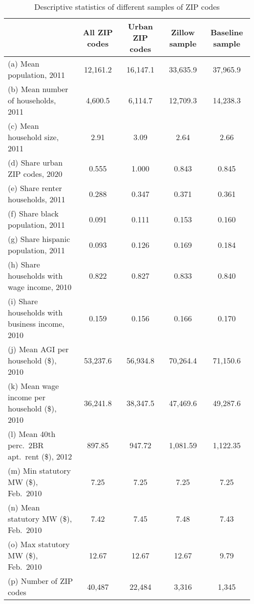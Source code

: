 \begin{table}[hbt!] \centering
    \caption{Descriptive statistics of different samples of ZIP codes}
    \label{tab:stats_zip_samples}
    \begin{tabular}{@{}lcccc@{}}
        \toprule
                                                         & \multicolumn{1}{c}{All ZIP codes}
                                                         & \multicolumn{1}{c}{Urban ZIP codes}
                                                         & \multicolumn{1}{c}{Zillow sample}
                                                         & \multicolumn{1}{c}{Baseline sample}          \\ \midrule
        (a) Mean population, 2011                        & 12,161.2 & 16,147.1 & 33,635.9 & 37,965.9     \\
        (b) Mean number of households, 2011              & 4,600.5  & 6,114.7  & 12,709.3 & 14,238.3     \\
        (c) Mean household size, 2011                    & 2.91     & 3.09    & 2.64    & 2.66           \\
        (d) Share urban ZIP codes, 2020                  & 0.555    & 1.000   & 0.843   & 0.845          \\
        (e) Share renter households, 2011                & 0.288    & 0.347   & 0.371   & 0.361          \\
        (f) Share black population, 2011                 & 0.091    & 0.111   & 0.153   & 0.160          \\
        (g) Share hispanic population, 2011              & 0.093    & 0.126   & 0.169   & 0.184          \\
        (h) Share households with wage income, 2010      & 0.822    & 0.827   & 0.833   & 0.840          \\
        (i) Share households with business income, 2010  & 0.159    & 0.156   & 0.166   & 0.170          \\
        (j) Mean AGI per household (\$), 2010           & 53,237.6 & 56,934.8 & 70,264.4 & 71,150.6      \\
        (k) Mean wage income per household (\$), 2010   & 36,241.8 & 38,347.5 & 47,469.6 & 49,287.6      \\
        (l) Mean 40th perc.\ 2BR apt.\ rent (\$), 2012   & 897.85  & 947.72  & 1,081.59  & 1,122.35      \\
        (m) Min statutory MW (\$), Feb.\ 2010            & 7.25    & 7.25    & 7.25     & 7.25           \\
        (n) Mean statutory MW (\$), Feb.\ 2010           & 7.42    & 7.45    & 7.48     & 7.43           \\
        (o) Max statutory MW (\$), Feb.\ 2010            & 12.67   & 12.67   & 12.67    & 9.79           \\
        (p) Number of ZIP codes                          & 40,487  & 22,484  & 3,316    & 1,345          \\ \bottomrule
    \end{tabular}


\end{table}
